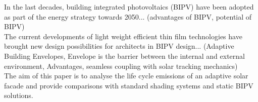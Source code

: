
In the last decades, building integrated photovoltaics (BIPV) have been adopted as part of the energy strategy towards 2050... (advantages of BIPV, potential of BIPV)\\

The current developments of light weight efficient thin film technologies have brought new design possibilities for architects in BIPV design... (Adaptive Building Envelopes, Envelope is the barrier between the internal and external environment, Advantages, seamless coupling with solar tracking mechanics) \\

The aim of this paper is to analyse the life cycle emissions of an adaptive solar facade and provide comparisons with standard shading systems and static BIPV solutions.\\
